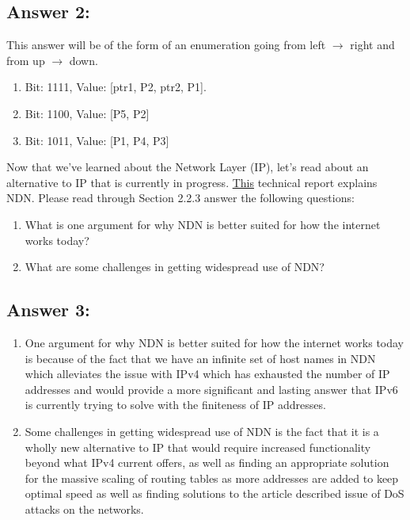 \documentclass[10pt]{article}
\newenvironment{problem}[2][Problem]{\begin{trivlist}
\item[\hskip \labelsep {\bfseries #1}\hskip \labelsep {\bfseries #2.}]}{\end{trivlist}}
\begin{document}
\subsection*{Answer 2:}
This answer will be of the form of an enumeration going from left $\to$ right and from up $\to$ down.
\begin{enumerate}
    \item Bit: 1111, Value: [ptr1, P2, ptr2, P1].
    \item Bit: 1100, Value: [P5, P2]
    \item Bit: 1011, Value: [P1, P4, P3]
\end{enumerate}

\begin{problem}{3: Reading}
Now that we've learned about the Network Layer (IP), let's read about an alternative to IP that is currently in progress. \href{https://named-data.net/techreport/TR001ndn-proj.pdf}{This} technical report explains NDN. Please read through Section 2.2.3 answer the following questions:
\begin{enumerate}
    \item What is one argument for why NDN is better suited for how the internet works today?
    \item What are some challenges in getting widespread use of NDN?
\end{enumerate}
\end{problem}

\subsection*{Answer 3:}
\begin{enumerate}
    \item One argument for why NDN is better suited for how the internet works today is because of the fact that we have an infinite set of host names in NDN which alleviates the issue with IPv4 which has exhausted the number of IP addresses and would provide a more significant and lasting answer that IPv6 is currently trying to solve with the finiteness of IP addresses.
    \item Some challenges in getting widespread use of NDN is the fact that it is a wholly new alternative to IP that would require increased functionality beyond what IPv4 current offers, as well as finding an appropriate solution for the massive scaling of routing tables as more addresses are added to keep optimal speed as well as finding solutions to the article described issue of DoS attacks on the networks.
\end{enumerate}
\end{document}
